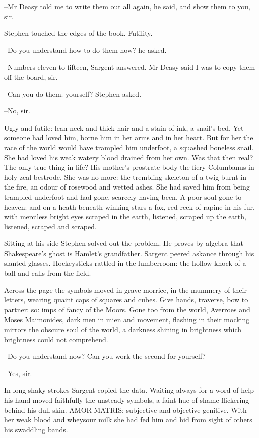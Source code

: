 --Mr Deasy told me to write them out all again, he said, and show them to
you, sir.

Stephen touched the edges of the book. Futility.

--Do you understand how to do them now? he asked.

--Numbers eleven to fifteen, Sargent answered. Mr Deasy said I was to
copy them off the board, sir.

--Can you do them. yourself? Stephen asked.

--No, sir.

Ugly and futile: lean neck and thick hair and a stain of ink, a snail's
bed. Yet someone had loved him, borne him in her arms and in her heart.
But for her the race of the world would have trampled him underfoot, a
squashed boneless snail. She had loved his weak watery blood drained from
her own. Was that then real? The only true thing in life? His mother's
prostrate body the fiery Columbanus in holy zeal bestrode. She was no
more: the trembling skeleton of a twig burnt in the fire, an odour of
rosewood and wetted ashes. She had saved him from being trampled
underfoot and had gone, scarcely having been. A poor soul gone to heaven:
and on a heath beneath winking stars a fox, red reek of rapine in his fur,
with merciless bright eyes scraped in the earth, listened, scraped up the
earth, listened, scraped and scraped.

Sitting at his side Stephen solved out the problem. He proves by
algebra that Shakespeare's ghost is Hamlet's grandfather. Sargent peered
askance through his slanted glasses. Hockeysticks rattled in the
lumberroom: the hollow knock of a ball and calls from the field.

Across the page the symbols moved in grave morrice, in the mummery
of their letters, wearing quaint caps of squares and cubes. Give hands,
traverse, bow to partner: so: imps of fancy of the Moors. Gone too from
the world, Averroes and Moses Maimonides, dark men in mien and
movement, flashing in their mocking mirrors the obscure soul of the
world, a darkness shining in brightness which brightness could not
comprehend.

--Do you understand now? Can you work the second for yourself?

--Yes, sir.

In long shaky strokes Sargent copied the data. Waiting always for a
word of help his hand moved faithfully the unsteady symbols, a faint hue
of shame flickering behind his dull skin. AMOR MATRIS: subjective and
objective genitive. With her weak blood and wheysour milk she had fed him
and hid from sight of others his swaddling bands.

